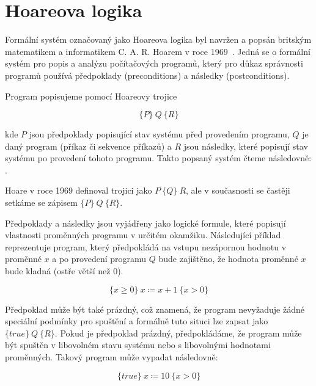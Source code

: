 \chapter{Hoareova logika}
\label{ch:hoareova-logika}

Formální systém označovaný jako Hoareova logika byl navržen a popsán
britským matematikem a informatikem C. A. R. Hoarem v roce 1969~\cite{Hoare1969}.
Jedná se o formální systém pro popis a analýzu počítačových programů,
který pro důkaz správnosti programů používá předpoklady (preconditions) a následky (postconditions).

Program popisujeme pomocí Hoareovy trojice

\begin{equation*}
    \{P\} \  Q \  \{R\}
\end{equation*}

kde $P$ jsou předpoklady popisující stav systému před provedením programu,
$Q$ je daný program (příkaz či sekvence příkazů)
a $R$ jsou následky, které popisují stav systému po provedení tohoto programu.
Takto popsaný systém čteme následovně:
.

Hoare v roce 1969 definoval trojici jako $P \ \{ Q \} \  R$,
ale v současnosti se častěji setkáme se zápisem $\{ P \} \  Q \ \{ R \}$.

Předpoklady a následky jsou vyjádřeny jako logické formule,
které popisují vlastnosti proměnných programu v určitém okamžiku.
Následující příklad reprezentuje program, který předpokládá na vstupu nezápornou hodnotu v proměnné $x$
a po provedení programu $Q$ bude zajištěno, že hodnota proměnné $x$ bude kladná (ostře větší než 0).

\begin{equation*}
    \{ x \geq 0 \} \  x \coloneqq x + 1 \  \{ x > 0 \}
\end{equation*}

Předpoklad může být také prázdný, což znamená, že program nevyžaduje žádné speciální podmínky pro spuštění
a formálně tuto situci lze zapsat jako $\{ true \} \  Q \  \{ R \}$.
Pokud je předpoklad prázdný, předpokládáme, že program může být spuštěn
v libovolném stavu systému nebo s libovolnými hodnotami proměnných.
Takový program může vypadat následovně:

\begin{equation*}
    \{ true \} \  x \coloneqq 10 \  \{ x > 0 \}
\end{equation*}

